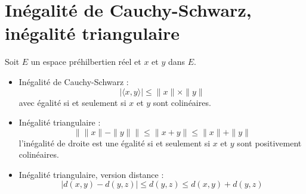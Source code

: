 \documentclass[../main.tex]{subfiles}
\begin{document}
\section{Inégalité de Cauchy-Schwarz, inégalité triangulaire}
\begin{tcolorbox}[title=Théorème 34.16, title filled=false, colframe=orange, colback=orange!10!white]
    Soit $E$ un espace préhilbertien réel et $x$ et $y$ dans $E$.
    \begin{itemize}
        \item Inégalité de Cauchy-Schwarz :
        $$|\langle x, y\rangle| \leq\|x\| \times\|y\|$$
        avec égalité si et seulement si $x$ et $y$ sont colinéaires.
        \item Inégalité triangulaire :
        $$\|\|x\|-\| y\|\|\leq\| x+y\| \leq\|x\|+\|y\|$$
        l'inégalité de droite est une égalité si et seulement si $x$ et $y$ sont positivement colinéaires.
        \item Inégalité triangulaire, version distance :
        $$|d(x, y)-d(y, z)| \leq d(y, z) \leq d(x, y)+d(y, z)$$
    \end{itemize}
\end{tcolorbox}
\end{document}
